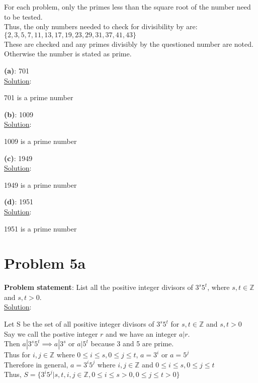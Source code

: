 \documentclass{article} %
\begin{document}
\begin{addmargin}[1em]{0em}
For each problem, only the primes less than the square root of the number need to be tested.
\\Thus, the only numbers needed to check for divisibility by are: 
\\$\{2,3,5,7,11,13,17,19,23,29,31,37,41,43\}$
\\These are checked and any primes divisibly by the questioned number are noted.  Otherwise the number is stated as prime.

\hfill \break
\textbf{(a)}: 701
\\ \hfill \break
\underline{Solution}: 
\begin{addmargin}[1em]{0em}
701 is a prime number
\end{addmargin}
\hfill \break

\textbf{(b)}: 1009
\\ \hfill \break
\underline{Solution}: 
\begin{addmargin}[1em]{0em}
1009 is a prime number
\end{addmargin}
\hfill \break

\textbf{(c)}: 1949
\\ \hfill \break
\underline{Solution}: 
\begin{addmargin}[1em]{0em}
1949 is a prime number
\end{addmargin}
\hfill \break

\textbf{(d)}: 1951
\\ \hfill \break
\underline{Solution}: 
\begin{addmargin}[1em]{0em}
1951 is a prime number
\end{addmargin}
\end{addmargin}

\newpage

\section*{Problem 5a}


\textbf{Problem statement}: List all the positive integer divisors of $3^s5^t$, where $s, t \in \mathbb{Z}$ and $s, t > 0$.
\\

\underline{Solution}: 
\begin{addmargin}[1em]{0em}
Let S be the set of all positive integer divisors of $3^s5^t$ for $s, t \in \mathbb{Z}$ and $s, t > 0$
\\Say we call the postive integer $r$ and we have an integer $a|r$.
\\Then $a|3^s5^t \implies a|3^s$ or $a|5^t$ because 3 and 5 are prime.
\\Thus for $i, j \in \mathbb{Z}$ where $0 \leq i \leq s, 0 \leq j \leq t$, $a = 3^{i}$ or $a = 5^{j}$
\\Therefore in general, $a = 3^i5^j$ where $i, j \in \mathbb{Z}$ and $0 \leq i \leq s, 0 \leq j \leq t$
\\Thus, $S = \{3^i5^j | s, t, i, j \in \mathbb{Z}, 0 \leq i \leq s > 0, 0 \leq j \leq t > 0\}$
\end{addmargin}
\end{document}
